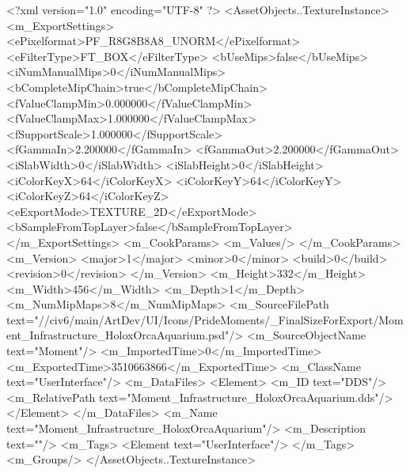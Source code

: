 <?xml version="1.0" encoding="UTF-8" ?>
<AssetObjects..TextureInstance>
	<m_ExportSettings>
		<ePixelformat>PF_R8G8B8A8_UNORM</ePixelformat>
		<eFilterType>FT_BOX</eFilterType>
		<bUseMips>false</bUseMips>
		<iNumManualMips>0</iNumManualMips>
		<bCompleteMipChain>true</bCompleteMipChain>
		<fValueClampMin>0.000000</fValueClampMin>
		<fValueClampMax>1.000000</fValueClampMax>
		<fSupportScale>1.000000</fSupportScale>
		<fGammaIn>2.200000</fGammaIn>
		<fGammaOut>2.200000</fGammaOut>
		<iSlabWidth>0</iSlabWidth>
		<iSlabHeight>0</iSlabHeight>
		<iColorKeyX>64</iColorKeyX>
		<iColorKeyY>64</iColorKeyY>
		<iColorKeyZ>64</iColorKeyZ>
		<eExportMode>TEXTURE_2D</eExportMode>
		<bSampleFromTopLayer>false</bSampleFromTopLayer>
	</m_ExportSettings>
	<m_CookParams>
		<m_Values/>
	</m_CookParams>
	<m_Version>
		<major>1</major>
		<minor>0</minor>
		<build>0</build>
		<revision>0</revision>
	</m_Version>
	<m_Height>332</m_Height>
	<m_Width>456</m_Width>
	<m_Depth>1</m_Depth>
	<m_NumMipMaps>8</m_NumMipMaps>
	<m_SourceFilePath text="//civ6/main/ArtDev/UI/Icons/PrideMoments/_FinalSizeForExport/Moment_Infrastructure_HoloxOrcaAquarium.psd"/>
	<m_SourceObjectName text="Moment"/>
	<m_ImportedTime>0</m_ImportedTime>
	<m_ExportedTime>3510663866</m_ExportedTime>
	<m_ClassName text="UserInterface"/>
	<m_DataFiles>
		<Element>
			<m_ID text="DDS"/>
			<m_RelativePath text="Moment_Infrastructure_HoloxOrcaAquarium.dds"/>
		</Element>
	</m_DataFiles>
	<m_Name text="Moment_Infrastructure_HoloxOrcaAquarium"/>
	<m_Description text=""/>
	<m_Tags>
		<Element text="UserInterface"/>
	</m_Tags>
	<m_Groups/>
</AssetObjects..TextureInstance>

